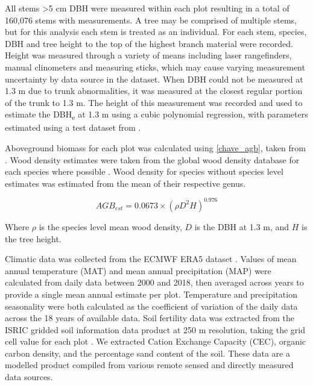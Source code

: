 \documentclass[11pt,a4paper]{article}
\begin{document}
All stems >5 cm DBH were measured within each plot resulting in a total of 160,076 stems with measurements. A tree may be comprised of multiple stems, but for this analysis each stem is treated as an individual. For each stem, species, DBH and tree height to the top of the highest branch material were recorded. Height was measured through a variety of means including laser rangefinders, manual clinometers and measuring sticks, which may cause varying measurement uncertainty by data source in the dataset. When DBH could not be measured at 1.3 m due to trunk abnormalities, it was measured at the closest regular portion of the trunk to 1.3 m. The height of this measurement was recorded and used to estimate the DBH\textsubscript{e} at 1.3 m using a cubic polynomial regression, with parameters estimated using a test dataset from \citet{Ryanunbublished}.

Aboveground biomass for each plot was calculated using \autoref{chave_agb}, taken from \citet{Chave2014}. Wood density estimates were taken from the global wood density database for each species where possible \citep{Chave2009, Zanne2009}. Wood density for species without species level estimates was estimated from the mean of their respective genus. 

\begin{equation}
	AGB_{est} = 0.0673 \times (\rho D^{2} H)^{0.976}
	\label{chave_agb}
\end{equation}

Where $\rho$ is the species level mean wood density, $D$ is the DBH at 1.3 m, and $H$ is the tree height.

Climatic data was collected from the ECMWF ERA5 dataset \citep{}. Values of mean annual temperature (MAT) and mean annual precipitation (MAP) were calculated from daily data between 2000 and 2018, then averaged across years to provide a single mean annual estimate per plot. Temperature and precipitation seasonality were both calculated as the coefficient of variation of the daily data across the 18 years of available data. Soil fertility data was extracted from the ISRIC gridded soil information data product at 250 m resolution, taking the grid cell value for each plot \citep{Hengl2017}. We extracted Cation Exchange Capacity (CEC), organic carbon density, and the percentage sand content of the soil. These data are a modelled product compiled from various remote sensed and directly measured data sources. 

% 
% 
\end{document}
